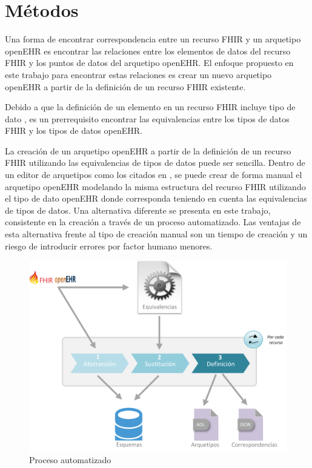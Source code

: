 \section{Métodos}

 Una forma de encontrar correspondencia entre un recurso FHIR y un arquetipo openEHR es encontrar las relaciones entre los elementos de datos del recurso FHIR y los puntos de datos del arquetipo openEHR. El enfoque propuesto en este trabajo para encontrar estas relaciones es crear un nuevo arquetipo openEHR a partir de la definición de un recurso FHIR existente.

Debido a que la definición de un elemento en un recurso FHIR incluye tipo de dato \cite{FHIRElement}, es un prerrequisito encontrar las equivalencias entre los tipos de datos FHIR y los tipos de datos openEHR.

La creación de un arquetipo openEHR a partir de la definición de un recurso FHIR utilizando las equivalencias de tipos de datos puede ser sencilla. Dentro de un editor de arquetipos como los citados en \cite{openEHRModellingTools}, se puede crear de forma manual el arquetipo openEHR modelando la misma estructura del recurso FHIR utilizando el tipo de dato openEHR donde corresponda teniendo en cuenta las equivalencias de tipos de datos. Una alternativa diferente se presenta en este trabajo, consistente en la creación a través de un proceso automatizado. Las ventajas de esta alternativa frente al tipo de creación manual son un tiempo de creación y un riesgo de introducir errores por factor humano menores.

\begin{figure}[h]
  \centering
  \includegraphics[scale=0.5]{./images/solution}
  \caption{Proceso automatizado}
  \label{fig:solution}
\end{figure}




